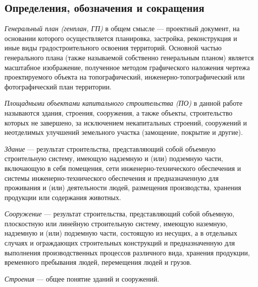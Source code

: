 \subsection*{\Large{Определения, обозначения и сокращения}}
\par
\textit{Генеральный план (генплан, ГП)} в общем смысле —
проектный документ, на основании которого осуществляется планировка,
застройка, реконструкция и иные виды градостроительного освоения территорий.
Основной частью генерального плана (также называемой собственно генеральным планом)
является масштабное изображение, полученное методом графического наложения чертежа
проектируемого объекта на топографический,
инженерно-топографический или фотографический план территории.
\par
\textit{Площадными объектами капитального строительства (ПО)} в данной работе называются
здания, строения, сооружения, а также объекты, строительство которых не завершено, за исключением некапитальных строений,
сооружений и неотделимых улучшений земельного участка (замощение, покрытие и другие).
\par
\textit{Здание} — результат строительства, представляющий собой объемную строительную систему,
имеющую надземную и (или) подземную части, включающую в себя помещения,
сети инженерно-технического обеспечения и системы инженерно-технического обеспечения и предназначенную для проживания и
(или) деятельности людей, размещения производства, хранения продукции или содержания животных.
\par
\textit{Сооружение} — результат строительства,
представляющий собой объемную, плоскостную или линейную строительную систему,
имеющую наземную, надземную и (или) подземную части, состоящую из несущих,
а в отдельных случаях и ограждающих строительных конструкций и предназначенную для выполнения
производственных процессов различного вида, хранения продукции, временного пребывания людей, перемещения людей и грузов.
\par
\textit{Строения} — общее понятие зданий и сооружений.
